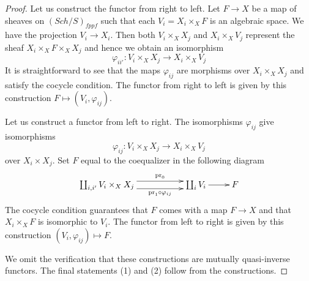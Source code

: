 \documentclass{stacks-project}
\theoremstyle{plain}
\theoremstyle{definition}
\theoremstyle{remark}
\numberwithin{equation}{subsection}
\def\Sch{\mathit{Sch}}
\begin{document}
\begin{proof}
Let us construct the functor from right to left.
Let $F \to X$ be a map of sheaves on $(\Sch/S)_{fppf}$ such that each
$V_i = X_i \times_X F$ is an algebraic space. We have the
projection $V_i \to X_i$.
Then both $V_i \times_X X_j$ and $X_i \times_X V_j$
represent the sheaf $X_i \times_X F \times_X X_j$
and hence we obtain an isomorphism
$$
\varphi_{ii'} : V_i \times_X X_j \to X_i \times_X V_j
$$
It is straightforward to see that the maps $\varphi_{ij}$
are morphisms over $X_i \times_X X_j$ and satisfy the
cocycle condition. The functor from right to left is given
by this construction $F \mapsto (V_i, \varphi_{ij})$.

\medskip\noindent
Let us construct a functor from left to right.
The isomorphisms $\varphi_{ij}$ give isomorphisms
$$
\varphi_{ij} : V_i \times_X X_j \longrightarrow X_i \times_X V_j
$$
over $X_i \times X_j$. Set $F$ equal to the coequalizer in the
following diagram
$$
\xymatrix{
\coprod_{i, i'} V_i \times_X X_j
\ar@<1ex>[rr]^-{\text{pr}_0}
\ar@<-1ex>[rr]_-{\text{pr}_1 \circ \varphi_{ij}}
& &
\coprod_i V_i \ar[r]
&
F
}
$$
The cocycle condition guarantees that $F$ comes with a map
$F \to X$ and that $X_i \times_X F$ is isomorphic to $V_i$.
The functor from left to right is given
by this construction $(V_i, \varphi_{ij}) \mapsto F$.

\medskip\noindent
We omit the verification that these constructions
are mutually quasi-inverse functors. The final statements
(1) and (2) follow from the constructions.
\end{proof}








\end{document}
